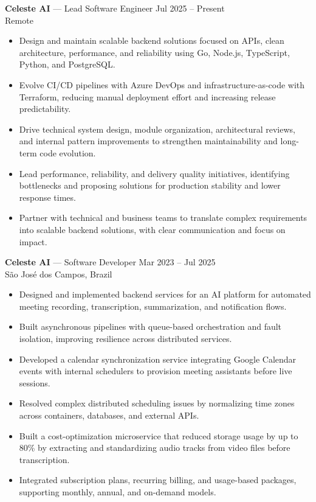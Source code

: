 \documentclass[11pt,a4paper]{article}
\begin{document}
\textbf{Celeste AI} — Lead Software Engineer \hfill Jul 2025 – Present \\
Remote
\vspace{-4pt}
\begin{itemize}[leftmargin=*]
  \item Design and maintain scalable backend solutions focused on APIs, clean architecture, performance, and reliability using Go, Node.js, TypeScript, Python, and PostgreSQL.
  \item Evolve CI/CD pipelines with Azure DevOps and infrastructure-as-code with Terraform, reducing manual deployment effort and increasing release predictability.
  \item Drive technical system design, module organization, architectural reviews, and internal pattern improvements to strengthen maintainability and long-term code evolution.
  \item Lead performance, reliability, and delivery quality initiatives, identifying bottlenecks and proposing solutions for production stability and lower response times.
  \item Partner with technical and business teams to translate complex requirements into scalable backend solutions, with clear communication and focus on impact.
\end{itemize}

\vspace{8pt}
\textbf{Celeste AI} — Software Developer \hfill Mar 2023 – Jul 2025 \\
São José dos Campos, Brazil
\vspace{-4pt}
\begin{itemize}[leftmargin=*]
  \item Designed and implemented backend services for an AI platform for automated meeting recording, transcription, summarization, and notification flows.
  \item Built asynchronous pipelines with queue-based orchestration and fault isolation, improving resilience across distributed services.
  \item Developed a calendar synchronization service integrating Google Calendar events with internal schedulers to provision meeting assistants before live sessions.
  \item Resolved complex distributed scheduling issues by normalizing time zones across containers, databases, and external APIs.
  \item Built a cost-optimization microservice that reduced storage usage by up to 80\% by extracting and standardizing audio tracks from video files before transcription.
  \item Integrated subscription plans, recurring billing, and usage-based packages, supporting monthly, annual, and on-demand models.
\end{itemize}
\end{document}
